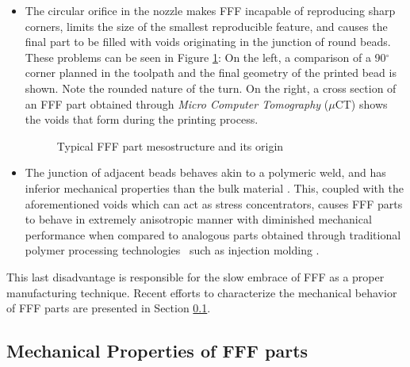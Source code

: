 \documentclass[main.tex]{subfiles}
\begin{document}
\begin{itemize}
	\item The circular orifice in the nozzle makes FFF incapable of reproducing sharp corners, limits the size of the smallest reproducible feature, and causes the final part to be filled with voids \textendash originating in the junction of round beads. These problems can be seen in Figure \ref{fig:FFFpartprob}: On the left, a comparison of a 90$^\circ$ corner planned in the toolpath and the final geometry of the printed bead is shown. Note the rounded nature of the turn. On the right, a cross section of an FFF part obtained through \emph{Micro Computer Tomography} ($\mu$CT) shows the voids that form during the printing process.
	\begin{figure}[h]
		\center
		\hfill
		\caption{Typical FFF part mesostructure and its origin} \label{fig:FFFpartprob}
	\end{figure}
	\item The junction of adjacent beads behaves akin to a polymeric weld, and has inferior mechanical properties than the bulk material \cite{Capote2017}. This, coupled with the aforementioned voids which can act as stress concentrators, causes FFF parts to behave in extremely anisotropic manner with diminished mechanical performance when compared to analogous parts obtained through traditional polymer processing technologies \textendash~such as injection molding \cite{Capote2017}.
\end{itemize}

This last disadvantage is responsible for the slow embrace of FFF as a proper manufacturing technique. Recent efforts to characterize the mechanical behavior of FFF parts are presented in Section \ref{ssec:mechPropFFF}.

\subsection{Mechanical Properties of FFF parts}\label{ssec:mechPropFFF}
\end{document}
